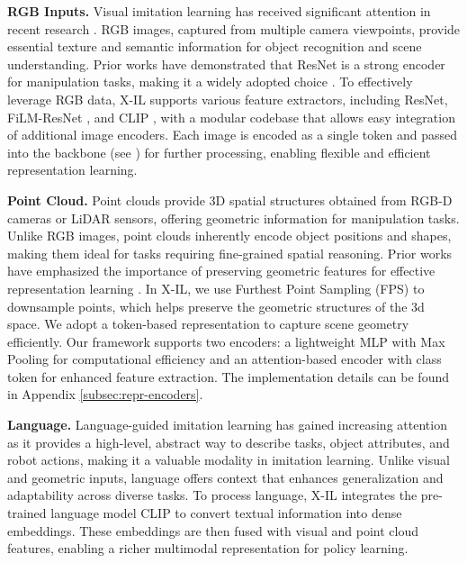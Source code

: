 \textbf{RGB Inputs.} 
Visual imitation learning has received significant attention in recent research \cite{chi2023diffusion}. RGB images, captured from multiple camera viewpoints, provide essential texture and semantic information for object recognition and scene understanding. Prior works have demonstrated that ResNet is a strong encoder for manipulation tasks, making it a widely adopted choice \cite{shafiullah2022behaviortransformerscloningk, wan2024lotuscontinualimitationlearning, zhu2023violaimitationlearningvisionbased}. To effectively leverage RGB data, X-IL supports various feature extractors, including ResNet, FiLM-ResNet \cite{turkoglu2022filmensembleprobabilisticdeeplearning}, and CLIP \cite{radford2021learningtransferablevisualmodels}, with a modular codebase that allows easy integration of additional image encoders. Each image is encoded as a single token and passed into the backbone (see ) for further processing, enabling flexible and efficient representation learning.

% 

\textbf{Point Cloud.}
Point clouds provide 3D spatial structures obtained from RGB-D cameras or LiDAR sensors, offering geometric information for manipulation tasks. Unlike RGB images, point clouds inherently encode object positions and shapes, making them ideal for tasks requiring fine-grained spatial reasoning. Prior works have emphasized the importance of preserving geometric features for effective representation learning \cite{wan2024lotuscontinualimitationlearning, ze20243ddiffusionpolicygeneralizable, gyenes2024pointpatchrlmaskedreconstruction}. In X-IL,
we use Furthest Point Sampling (FPS) \cite{qi2017pointnet} to downsample points, which helps preserve the geometric structures of the 3d space. We adopt a token-based representation to capture scene geometry efficiently. Our framework supports two encoders: a lightweight MLP with Max Pooling \cite{ze20243ddiffusionpolicygeneralizable} for computational efficiency and an attention-based encoder with class token for enhanced feature extraction. The implementation details can be found in Appendix \ref{subsec:repr-encoders}.

\textbf{Language.}
Language-guided imitation learning \cite{stepputtis2020languageconditionedimitationlearningrobot, lynch2021languageconditionedimitationlearning, mees2022matterslanguageconditionedrobotic, yu2023usingdemonstrationslanguageinstructions, reuss2024multimodaldiffusiontransformerlearning} has gained increasing attention as it provides a high-level, abstract way to describe tasks, object attributes, and robot actions, making it a valuable modality in imitation learning. Unlike visual and geometric inputs, language offers context that enhances generalization and adaptability across diverse tasks. To process language, X-IL integrates the pre-trained language model CLIP \cite{radford2021learningtransferablevisualmodels} to convert textual information into dense embeddings. These embeddings are then fused with visual and point cloud features, enabling a richer multimodal representation for policy learning.

